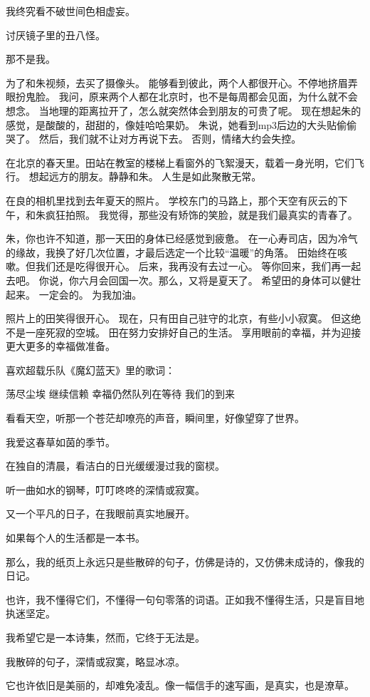 		我终究看不破世间色相虚妄。\par
		讨厌镜子里的丑八怪。\par
		那不是我。

	\endwriting



		为了和朱视频，去买了摄像头。
		能够看到彼此，两个人都很开心。不停地挤眉弄眼扮鬼脸。
		我问，原来两个人都在北京时，也不是每周都会见面，为什么就不会想念。
		当地理的距离拉开了，怎么就突然体会到朋友的可贵了呢。
		现在想起朱的感觉，是酸酸的，甜甜的，像娃哈哈果奶。
		朱说，她看到mp3后边的大头贴偷偷哭了。
		然后，我们就不让对方再说下去。
		否则，情绪大约会失控。

		在北京的春天里。田站在教室的楼梯上看窗外的飞絮漫天，载着一身光明，它们飞行。
		想起远方的朋友。静静和朱。
		人生是如此聚散无常。

		在良的相机里找到去年夏天的照片。
		学校东门的马路上，那个天空有灰云的下午，和朱疯狂拍照。
		我觉得，那些没有矫饰的笑脸，就是我们最真实的青春了。


		朱，你也许不知道，那一天田的身体已经感觉到疲惫。
		在一心寿司店，因为冷气的缘故，我换了好几次位置，才最后选定一个比较“温暖”的角落。
		田始终在咳嗽。但我们还是吃得很开心。
		后来，我再没有去过一心。
		等你回来，我们再一起去吧。
		你说，你六月会回国一次。那么，又将是夏天了。
		希望田的身体可以健壮起来。
		一定会的。
		为我加油。


		照片上的田笑得很开心。
		现在，只有田自己驻守的北京，有些小小寂寞。
		但这绝不是一座死寂的空城。
		田在努力安排好自己的生活。
		享用眼前的幸福，并为迎接更大更多的幸福做准备。

		喜欢超载乐队《魔幻蓝天》里的歌词：

		荡尽尘埃
		继续信赖
		幸福仍然队列在等待
		我们的到来

		看看天空，听那一个苍茫却嘹亮的声音，瞬间里，好像望穿了世界。

	\endwriting



		我爱这春草如茵的季节。


		在独自的清晨，看洁白的日光缓缓漫过我的窗棂。\par
		听一曲如水的钢琴，叮叮咚咚的深情或寂寞。\par
		又一个平凡的日子，在我眼前真实地展开。

		如果每个人的生活都是一本书。\par
		那么，我的纸页上永远只是些散碎的句子，仿佛是诗的，又仿佛未成诗的，像我的日记。\par
		也许，我不懂得它们，不懂得一句句零落的词语。正如我不懂得生活，只是盲目地执迷坚定。\par
		我希望它是一本诗集，然而，它终于无法是。\par
		我散碎的句子，深情或寂寞，略显冰凉。\par
		它也许依旧是美丽的，却难免凌乱。像一幅信手的速写画，是真实，也是潦草。

